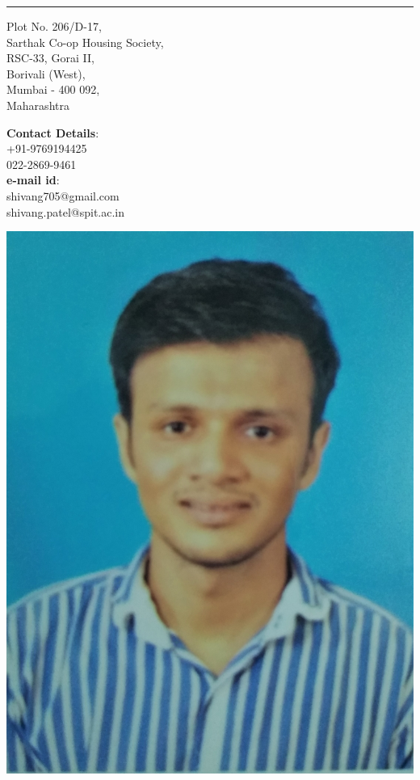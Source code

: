 \documentclass{article}
\renewcommand{\maketitle}{
\begin{center}
	{\huge\bfseries
	\theauthor}
\end{center}
}
\begin{document}
\author{Shivang Patel}\date{}
\maketitle

\hrule
\vspace{10pt}

\begin{minipage}{.4\textwidth}
Plot No. 206/D-17,\\ Sarthak Co-op Housing Society,\\ RSC-33, Gorai II,\\ Borivali (West),\\ Mumbai - 400 092,\\ Maharashtra
\end{minipage}
\begin{minipage}{.39\textwidth}
\textbf{Contact Details}:\\ +91-9769194425\\ 022-2869-9461\\
\textbf{e-mail id}:\\ shivang705@gmail.com\\ shivang.patel@spit.ac.in
\end{minipage}
\begin{minipage}{.4\textwidth}
	\includegraphics[scale=0.03]{myPhoto.jpg}
\end{minipage}
\end{document}
